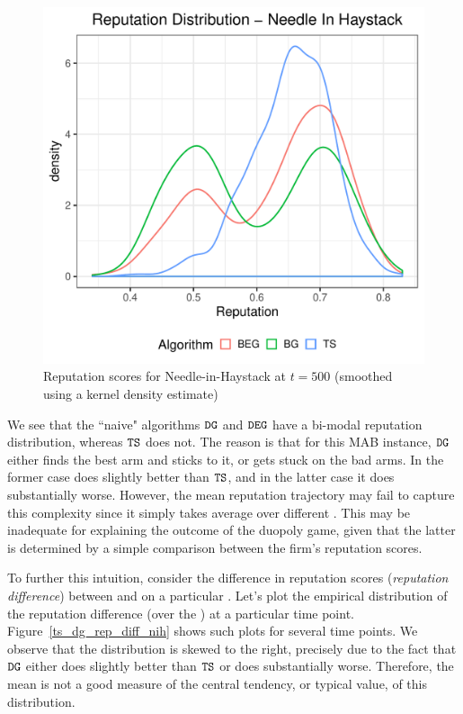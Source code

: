 \documentclass[../competing_bandits_with_appendix.tex]{subfiles}
\begin{document}
\begin{figure}[H]
\includegraphics[scale=0.35]{ec19paper/figures/rep_distribution_nih}
\caption{Reputation scores for Needle-in-Haystack at $t=500$ (smoothed using a kernel density estimate)}
\label{rep_dist_nih}
\end{figure}


We see that the ``naive" algorithms $\mathtt{DG}$ and $\mathtt{DEG}$ have a bi-modal reputation distribution, whereas $\mathtt{TS}$ does not. The reason is that for this MAB instance, $\mathtt{DG}$ either finds the best arm and sticks to it, or gets stuck on the bad arms. In the former case \DG does slightly better than $\mathtt{TS}$, and in the latter case it does substantially worse. However, the mean reputation trajectory may fail to capture this complexity since it simply takes average over different \MRVs. This may be inadequate for explaining the outcome of the duopoly game, given that the latter is determined by a simple comparison between the firm's reputation scores.

To further this intuition, consider the difference in reputation scores (\emph{reputation difference}) between \TS and \DG on a particular \MRV. Let's plot the empirical distribution of the reputation difference (over the \MRVs) at a particular time point. Figure~\ref{ts_dg_rep_diff_nih} shows such plots for several time points. We observe that the distribution is skewed to the right, precisely due to the fact that $\mathtt{DG}$ either does slightly better than $\mathtt{TS}$ or does substantially worse. Therefore, the mean is not a good measure of the central tendency, or typical value, of this distribution.
\end{document}
